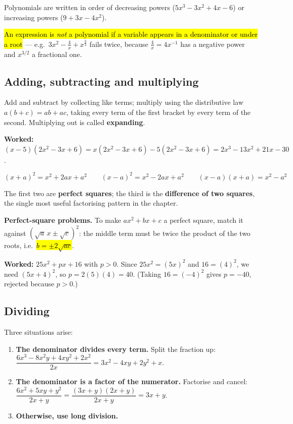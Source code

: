 \documentclass[11pt]{article}
\newcommand{\key}[1]{\hl{#1}}
\newcommand{\wex}[1]{\textbf{\color{lilacdeep}Worked:} #1}
\begin{document}
Polynomials are written in order of decreasing powers ($5x^{3}-3x^{2}+4x-6$) or increasing powers ($9+3x-4x^{2}$).

\key{An expression is \emph{not} a polynomial if a variable appears in a denominator or under a root} --- e.g.\ $3x^{2}-\frac{4}{x}+x^{\frac32}$ fails twice, because $\frac4x=4x^{-1}$ has a negative power and $x^{3/2}$ a fractional one.

\subsection*{Adding, subtracting and multiplying}

Add and subtract by collecting like terms; multiply using the distributive law $a(b+c)=ab+ac$, taking every term of the first bracket by every term of the second. Multiplying out is called \textbf{expanding}.

\wex{$(x-5)(2x^{2}-3x+6)=x(2x^{2}-3x+6)-5(2x^{2}-3x+6)=2x^{3}-13x^{2}+21x-30$.}

\begin{formulabox}
\[(x+a)^{2}=x^{2}+2ax+a^{2}\qquad (x-a)^{2}=x^{2}-2ax+a^{2}\qquad (x-a)(x+a)=x^{2}-a^{2}\]
\end{formulabox}

The first two are \textbf{perfect squares}; the third is the \textbf{difference of two squares}, the single most useful factorising pattern in the chapter.

\textbf{Perfect-square problems.} To make $ax^{2}+bx+c$ a perfect square, match it against $(\sqrt a\,x\pm\sqrt c)^{2}$: the middle term must be twice the product of the two roots, i.e.\ \key{\mbox{$b=\pm 2\sqrt{ac}$}}.

\wex{$25x^{2}+px+16$ with $p>0$. Since $25x^{2}=(5x)^{2}$ and $16=(4)^{2}$, we need $(5x+4)^{2}$, so $p=2(5)(4)=40$. (Taking $16=(-4)^{2}$ gives $p=-40$, rejected because $p>0$.)}

\subsection*{Dividing}

Three situations arise:

\begin{enumerate}[topsep=2pt,itemsep=1pt,leftmargin=*]
\item \textbf{The denominator divides every term.} Split the fraction up:
$\dfrac{6x^{3}-8x^{2}y+4xy^{2}+2x^{2}}{2x}=3x^{2}-4xy+2y^{2}+x$.
\item \textbf{The denominator is a factor of the numerator.} Factorise and cancel:
$\dfrac{6x^{2}+5xy+y^{2}}{2x+y}=\dfrac{(3x+y)(2x+y)}{2x+y}=3x+y$.
\item \textbf{Otherwise, use long division.}
\end{enumerate}
\end{document}
